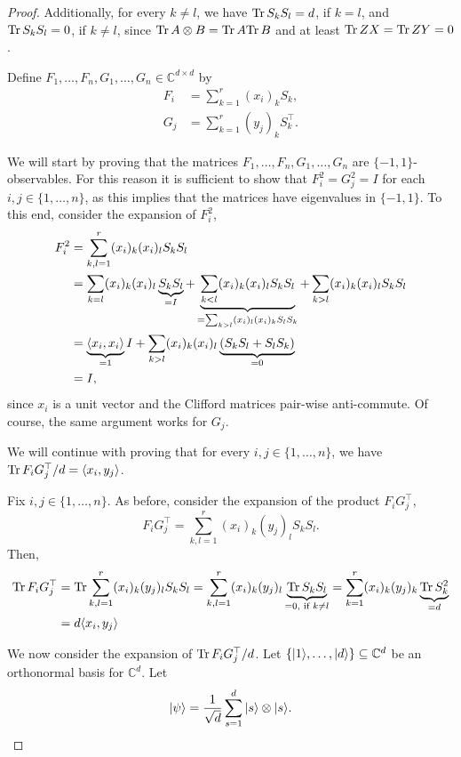 \begin{proof}
		Additionally, for every $k\neq l$, we have $\textup{Tr} \, {S_kS_l} =d$, if $k=l$, and $\textup{Tr} \, {S_kS_l} =0$, if $k\neq l$, since $\textup{Tr} \, {A\otimes B}  = \textup{Tr} \, {A} \textup{Tr} \, {B} $ and at least $\textup{Tr} \, {ZX} =\textup{Tr} \, {ZY} =0$.
		
		Define $F_1,\dots,F_n,G_1,\dots,G_n\in\mathbb{C}^{d\times d}$ by
		\begin{align}
			F_i&=\sum_{k=1}^r (x_i)_k S_k,\\
			G_j&=\sum_{k=1}^r (y_j)_k S_k^\top.
		\end{align}
		
		We will start by proving that the matrices $F_1,\dots,F_n,G_1,\dots,G_n$ are $\{-1,1\}$-observables.
		For this reason it is sufficient to show that $F_i^2=G_j^2=I$ for each $i,j\in\{1,\dots,n\}$, as this implies that the matrices have eigenvalues in $\{-1,1\}$. To this end, consider the expansion of $F_i^2$,
		\begin{align*}
			F_i^2 &= \sum_{k,l=1}^r (x_i)_k(x_i)_l S_k S_l \\
			&= \sum_{k=l} (x_i)_k(x_i)_l \underbrace{S_k S_l}_{=I} + \underbrace{\sum_{k<l} (x_i)_k(x_i)_l S_k S_l}_{=\sum_{k>l} (x_i)_l(x_i)_k S_l S_k} + \sum_{k>l} (x_i)_k(x_i)_l S_k S_l \\
			&= \underbrace{\langle{x_i},{x_i}\rangle}_{=1}I + \sum_{k>l} (x_i)_k(x_i)_l \underbrace{(S_k S_l+S_l S_k)}_{=0}\\
			&= I, 
		\end{align*}
		since $x_i$ is a unit vector and the Clifford matrices pair-wise anti-commute.
		Of course, the same argument works for $G_j$.
		
		We will continue with proving that for every $i,j\in\{1,\dots,n\}$, we have $\textup{Tr} \, {F_iG_j^\top} /d=\langle{x_i},{y_j}\rangle$.
		
		Fix $i,j\in\{1,\dots,n\}$. As before, consider the expansion of the product $F_iG_j^\top$,
		\begin{equation}
			F_iG_j^\top = \sum_{k,l=1}^r (x_i)_k(y_j)_lS_kS_l.
		\end{equation}
		Then,
		\begin{align*}
			\textup{Tr} \, {F_iG_j^\top}  &= \textup{Tr} \, {\sum_{k,l=1}^r (x_i)_k(y_j)_lS_kS_l}  
			= \sum_{k,l=1}^r (x_i)_k(y_j)_l \underbrace{\textup{Tr} \, {S_kS_l} }_{=0,\text{ if } k\neq l}
			= \sum_{k=1}^r (x_i)_k(y_j)_k \underbrace{\textup{Tr} \, {S_k^2} }_{=d}\\
			&= d \langle{x_i},{y_j}\rangle 
		\end{align*}
		
		We now consider the expansion of $\textup{Tr} \, {F_iG_j^\top} /d$. Let $\{\vert {1} \rangle,\dots,\vert {d} \rangle\}\subseteq \mathbb{C}^d$ be an orthonormal basis for $\mathbb{C}^d$. Let
		\begin{equation}
			\vert {\psi} \rangle = \frac{1}{\sqrt{d}} \sum_{s=1}^d \vert {s} \rangle \otimes \vert {s} \rangle.
		\end{equation} 
		

\end{proof}
